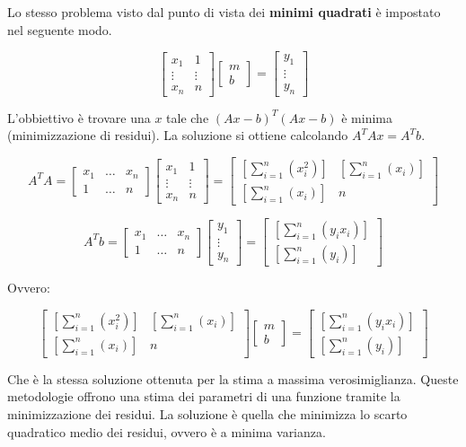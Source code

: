 \documentclass[\main/main.tex]{subfiles}
\begin{document}
Lo stesso problema visto dal punto di vista dei \textbf{minimi quadrati} è impostato nel seguente modo.

\[
\begin{bmatrix}
	x_1 & 1\\
	\vdots & \vdots \\
	x_n & n
\end{bmatrix}
\begin{bmatrix}
	m\\
	b
\end{bmatrix}
= 
\begin{bmatrix}
	y_1\\
	\vdots\\
	y_n
\end{bmatrix}
\]

L'obbiettivo è trovare una $x$ tale che $(Ax-b)^T(Ax-b)$ è minima (minimizzazione di residui).
La soluzione si ottiene calcolando $A^TAx = A^Tb$.

\[
A^TA = \begin{bmatrix}
	x_1 & \dots & x_n\\
	1 & \dots & n
\end{bmatrix}
\begin{bmatrix}
	x_1 & 1\\
	\vdots & \vdots \\
	x_n & n
\end{bmatrix}
=
\begin{bmatrix}
	\left [ \sum_{i=1}^n \left(x_i^2 \right) \right ] &  \left [ \sum_{i=1}^n \left(x_i \right) \right ] \\
	\left [ \sum_{i=1}^n \left(x_i \right) \right ] & n
\end{bmatrix}
\]

\[
A^Tb = \begin{bmatrix}
	x_1 & \dots & x_n\\
	1 & \dots & n
\end{bmatrix}
\begin{bmatrix}
	y_1\\
	\vdots\\
	y_n
\end{bmatrix}
=
\begin{bmatrix}
	\left [ \sum_{i=1}^n \left(y_i x_i \right) \right ] \\
	\left [ \sum_{i=1}^n \left(y_i \right) \right ]
\end{bmatrix}
\]

Ovvero:

\[
\begin{bmatrix}
	\left [ \sum_{i=1}^n \left(x_i^2 \right) \right ] &  \left [ \sum_{i=1}^n \left(x_i \right) \right ] \\
	\left [ \sum_{i=1}^n \left(x_i \right) \right ] & n
\end{bmatrix}
\begin{bmatrix}
m\\
b
\end{bmatrix}
= 
\begin{bmatrix}
	\left [ \sum_{i=1}^n \left(y_i x_i \right) \right ] \\
	\left [ \sum_{i=1}^n \left(y_i \right) \right ]
\end{bmatrix}
\]

Che è la stessa soluzione ottenuta per la stima a massima verosimiglianza. Queste metodologie offrono una stima dei parametri di una funzione tramite la minimizzazione dei residui.
La soluzione è quella che minimizza lo scarto quadratico medio dei residui, ovvero è a minima varianza.
\end{document}
